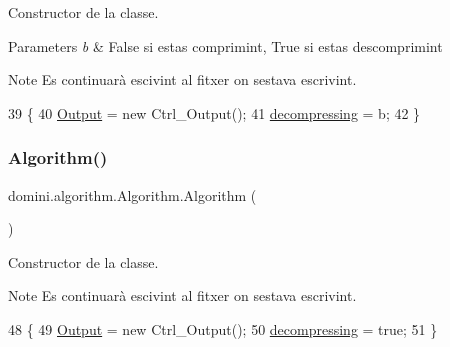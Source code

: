 Constructor de la classe. 


\begin{DoxyParams}{Parameters}
{\em b} & False si estas comprimint, True si estas descomprimint \\
\hline
\end{DoxyParams}
\begin{DoxyNote}{Note}
Es continuarà escivint al fitxer on s\textquotesingle{}estava escrivint. 
\end{DoxyNote}

\begin{DoxyCode}
39                                 \{
40         \hyperlink{classdomini_1_1algorithm_1_1Algorithm_a4de9955411c656325adc391ef570c082}{Output} = \textcolor{keyword}{new} Ctrl\_Output();
41         \hyperlink{classdomini_1_1algorithm_1_1Algorithm_a0ec73147fb68a16e53801ea5da35b089}{decompressing} = b;
42     \}
\end{DoxyCode}
\mbox{\label{classdomini_1_1algorithm_1_1Algorithm_ad67a7c097eb86c4fc033f8deecb845a4}} 
\subsubsection{\texorpdfstring{Algorithm()}{Algorithm()}\hspace{0.1cm}{\footnotesize\ttfamily [3/3]}}
{\footnotesize\ttfamily domini.\+algorithm.\+Algorithm.\+Algorithm (\begin{DoxyParamCaption}{ }\end{DoxyParamCaption})\hspace{0.3cm}{\ttfamily [inline]}}



Constructor de la classe. 

\begin{DoxyNote}{Note}
Es continuarà escivint al fitxer on s\textquotesingle{}estava escrivint. 
\end{DoxyNote}

\begin{DoxyCode}
48                        \{
49         \hyperlink{classdomini_1_1algorithm_1_1Algorithm_a4de9955411c656325adc391ef570c082}{Output} = \textcolor{keyword}{new} Ctrl\_Output();
50         \hyperlink{classdomini_1_1algorithm_1_1Algorithm_a0ec73147fb68a16e53801ea5da35b089}{decompressing} = \textcolor{keyword}{true};
51     \}
\end{DoxyCode}


